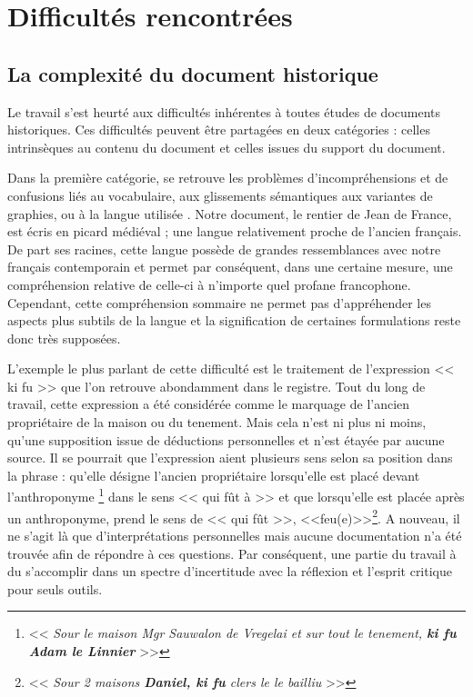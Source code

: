 \section{Difficultés rencontrées}

\subsection{La complexité du document historique}
Le travail s'est heurté aux difficultés inhérentes à toutes études de documents historiques. Ces difficultés peuvent  être partagées en deux catégories : celles intrinsèques au contenu du document et celles issues du support du document. 

Dans la première catégorie, se retrouve les problèmes d'incompréhensions et de confusions liés au vocabulaire, aux glissements sémantiques aux variantes de graphies, ou à la langue utilisée \parencite{piotrowski_natural_2012}.
Notre document, le rentier de Jean de France, est écris en picard médiéval ; une langue relativement proche de l'ancien français. De part ses racines, cette langue possède de grandes ressemblances avec notre français contemporain et permet par conséquent, dans une certaine mesure, une compréhension relative de celle-ci à n'importe quel profane francophone.
Cependant, cette compréhension sommaire ne permet pas d'appréhender les aspects plus subtils de la langue et la signification de certaines formulations reste donc très supposées. 

L'exemple le plus parlant de cette difficulté est le traitement de l'expression << ki fu >> que l'on retrouve abondamment dans le registre. Tout du long de travail, cette expression a été considérée comme le marquage de l'ancien propriétaire de la maison ou du tenement. Mais cela n'est ni plus ni moins, qu'une supposition issue de déductions personnelles et n'est étayée par aucune source. Il se pourrait que l'expression aient plusieurs sens selon sa position dans la phrase : qu'elle désigne l'ancien propriétaire lorsqu'elle est placé devant l'anthroponyme \footnote{ << \textit{Sour le  maison Mgr Sauwalon de Vregelai et sur tout le tenement, \textbf{ki fu Adam le Linnier}} >>} dans le sens << qui fût à >> et que lorsqu'elle est placée après  un anthroponyme, prend le sens de  << qui fût >>, <<feu(e)>>\footnote{ << \textit{Sour 2 maisons \textbf{Daniel, ki fu} clers le le bailliu} >> }. A nouveau, il ne s'agit là que d'interprétations personnelles mais aucune documentation n'a été trouvée afin de répondre à ces questions. Par conséquent, une partie du travail à du s'accomplir dans un spectre d'incertitude avec la réflexion et l'esprit critique pour seuls outils.

